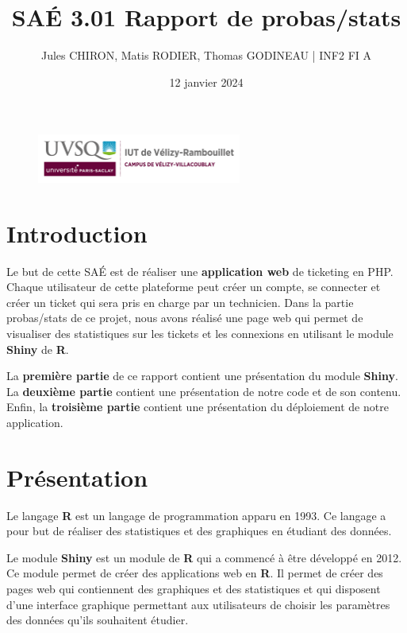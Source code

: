 \documentclass[12pt, a4paper]{article}
\title{SAÉ 3.01 Rapport de probas/stats}
\author{Jules CHIRON, Matis RODIER, Thomas GODINEAU | INF2 FI A}
\date{12 janvier 2024}
\begin{document}
\maketitle

\begin{figure}[h]
    \includegraphics[width=0.6\textwidth]{../annexes/logo_uvsq}
\end{figure}

\tableofcontents{}

\section*{Introduction}

Le but de cette SAÉ est de réaliser une \textbf{application web} de ticketing en PHP.\@
Chaque utilisateur de cette plateforme peut créer un compte, se connecter et créer un ticket qui sera pris en charge par un technicien.
Dans la partie probas/stats de ce projet, nous avons réalisé une page web qui permet de visualiser des statistiques sur les tickets et les connexions
en utilisant le module \textbf{Shiny} de \textbf{R}.
\bigskip

La \textbf{première partie} de ce rapport contient une présentation du module \textbf{Shiny}.
La \textbf{deuxième partie} contient une présentation de notre code et de son contenu.
Enfin, la \textbf{troisième partie} contient une présentation du déploiement de notre application.

\section{Présentation}

Le langage \textbf{R} est un langage de programmation apparu en 1993.
Ce langage a pour but de réaliser des statistiques et des graphiques en étudiant des données.
\bigskip

Le module \textbf{Shiny} est un module de \textbf{R} qui a commencé à être développé en 2012.
Ce  module permet de créer des applications web en \textbf{R}.
Il permet de créer des pages web qui contiennent des graphiques et des statistiques
et qui disposent d'une interface graphique permettant aux utilisateurs de choisir les paramètres des données qu'ils souhaitent étudier.
\bigskip
\end{document}
